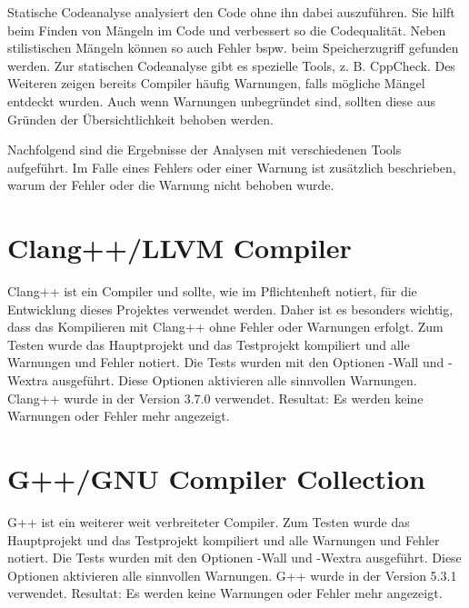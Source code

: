 Statische Codeanalyse analysiert den Code ohne ihn dabei auszuführen. Sie hilft beim Finden von Mängeln im Code und verbessert so die Codequalität. Neben stilistischen Mängeln können so auch Fehler bspw. beim Speicherzugriff gefunden werden. Zur statischen Codeanalyse gibt es spezielle Tools, z. B. CppCheck. Des Weiteren zeigen bereits Compiler häufig Warnungen, falls mögliche Mängel entdeckt wurden. Auch wenn Warnungen unbegründet sind, sollten diese aus Gründen der Übersichtlichkeit behoben werden. \par
Nachfolgend sind die Ergebnisse der Analysen mit verschiedenen Tools aufgeführt. Im Falle eines Fehlers oder einer Warnung ist zusätzlich beschrieben, warum der Fehler oder die Warnung nicht behoben wurde.

\section{Clang++/LLVM Compiler}
Clang++ ist ein Compiler und sollte, wie im Pflichtenheft notiert, für die Entwicklung dieses Projektes verwendet werden. Daher ist es besonders wichtig, dass das Kompilieren mit Clang++ ohne Fehler oder Warnungen erfolgt. Zum Testen wurde das Hauptprojekt und das Testprojekt kompiliert und alle Warnungen und Fehler notiert. Die Tests wurden mit den Optionen -Wall und -Wextra ausgeführt. Diese Optionen aktivieren alle sinnvollen Warnungen. Clang++ wurde in der Version 3.7.0 verwendet.
Resultat: Es werden keine Warnungen oder Fehler mehr angezeigt.

\section{G++/GNU Compiler Collection}
G++ ist ein weiterer weit verbreiteter Compiler. Zum Testen wurde das Hauptprojekt und das Testprojekt kompiliert und alle Warnungen und Fehler notiert. Die Tests wurden mit den Optionen -Wall und -Wextra ausgeführt. Diese Optionen aktivieren alle sinnvollen Warnungen. G++ wurde in der Version 5.3.1 verwendet.
Resultat: Es werden keine Warnungen oder Fehler mehr angezeigt.

